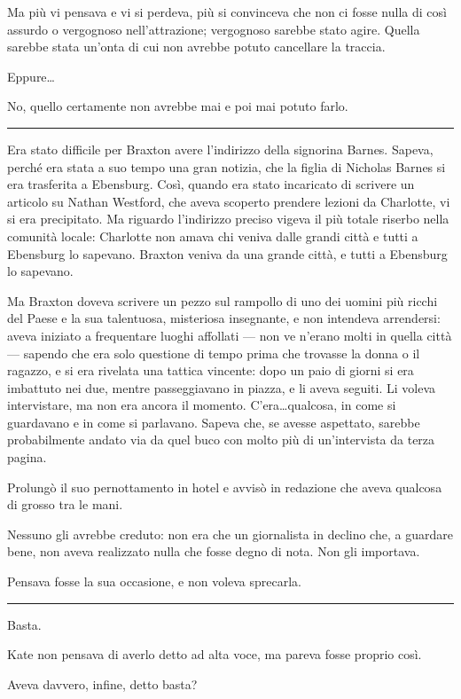 \documentclass[a4paper,oneside,11pt]{memoir}
\begin{document}
Ma più vi pensava e vi si perdeva, più si convinceva che non ci fosse nulla di così assurdo o
vergognoso nell'attrazione; vergognoso sarebbe stato agire. Quella sarebbe stata un'onta di cui non
avrebbe potuto cancellare la traccia.

Eppure\dots

No, quello certamente non avrebbe mai e poi mai potuto farlo.

\plainbreak{1}

Era stato difficile per Braxton avere l'indirizzo della signorina Barnes. Sapeva, perché era stata a
suo tempo una gran notizia, che la figlia di Nicholas Barnes si era trasferita a Ebensburg. Così,
quando era stato incaricato di scrivere un articolo su Nathan Westford, che aveva scoperto prendere
lezioni da Charlotte, vi si era precipitato. Ma riguardo l'indirizzo preciso vigeva il più totale
riserbo nella comunità locale: Charlotte non amava chi veniva dalle grandi città e tutti a Ebensburg
lo sapevano. Braxton veniva da una grande città, e tutti a Ebensburg lo sapevano.

Ma Braxton doveva scrivere un pezzo sul rampollo di uno dei uomini più ricchi del Paese e la sua
talentuosa, misteriosa insegnante, e non intendeva arrendersi: aveva iniziato a frequentare luoghi
affollati — non ve n'erano molti in quella città — sapendo che era solo questione di tempo prima che
trovasse la donna o il ragazzo, e si era rivelata una tattica vincente: dopo un paio di giorni si
era imbattuto nei due, mentre passeggiavano in piazza, e li aveva seguiti. Li voleva intervistare,
ma non era ancora il momento. C'era\dots qualcosa, in come si guardavano e in come si parlavano.
Sapeva che, se avesse aspettato, sarebbe probabilmente andato via da quel buco con molto più di
un'intervista da terza pagina.

Prolungò il suo pernottamento in hotel e avvisò in redazione che aveva qualcosa di grosso tra le
mani.

Nessuno gli avrebbe creduto: non era che un giornalista in declino che, a guardare bene, non aveva
realizzato nulla che fosse degno di nota. Non gli importava.

Pensava fosse la sua occasione, e non voleva sprecarla.

\plainbreak{1}

Basta.

Kate non pensava di averlo detto ad alta voce, ma pareva fosse proprio così.

Aveva davvero, infine, detto basta?
\end{document}
